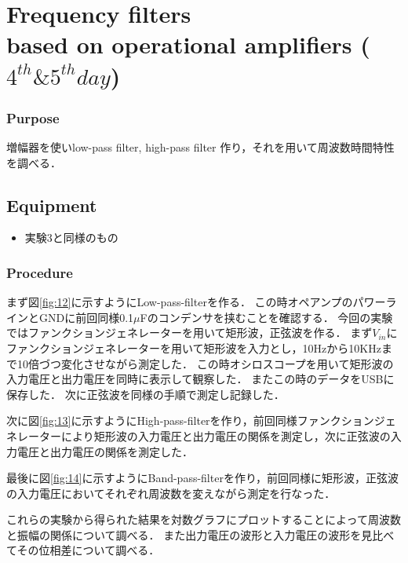 \documentclass[11pt, a4paper,twocolumn]{jarticle}
\begin{document}
\section{Frequency filters \\based on operational amplifiers ($4^{th} \& 5^{th} day$)}
\subsubsection{Purpose}
増幅器を使いlow-pass filter, high-pass filter 作り，それを用いて周波数時間特性を調べる．
\subsection{Equipment}
\begin{itemize}
    \item 実験3と同様のもの
\end{itemize}
\subsubsection{Procedure}
まず図\ref{fig:12}に示すようにLow-pass-filterを作る．
この時オペアンプのパワーラインとGNDに前回同様0.1$\mu$Fのコンデンサを挟むことを確認する．
今回の実験ではファンクションジェネレーターを用いて矩形波，正弦波を作る．
まず$V_{in}$にファンクションジェネレーターを用いて矩形波を入力とし，10Hzから10KHzまで10倍づつ変化させながら測定した．
この時オシロスコープを用いて矩形波の入力電圧と出力電圧を同時に表示して観察した．
またこの時のデータをUSBに保存した．
次に正弦波を同様の手順で測定し記録した．

次に図\ref{fig:13}に示すようにHigh-pass-filterを作り，前回同様ファンクションジェネレーターにより矩形波の入力電圧と出力電圧の関係を測定し，次に正弦波の入力電圧と出力電圧の関係を測定した．

最後に図\ref{fig:14}に示すようにBand-pass-filterを作り，前回同様に矩形波，正弦波の入力電圧においてそれぞれ周波数を変えながら測定を行なった．

これらの実験から得られた結果を対数グラフにプロットすることによって周波数と振幅の関係について調べる．
また出力電圧の波形と入力電圧の波形を見比べてその位相差について調べる．
\end{document}
